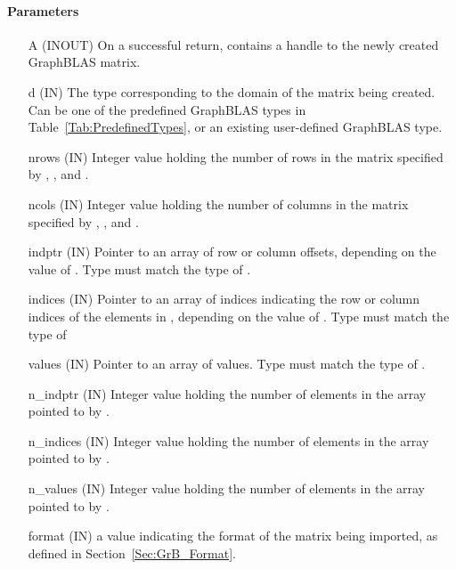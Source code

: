 \paragraph{Parameters}

\begin{itemize}[leftmargin=1.1in]
    \item[{\sf A}]      ({\sf INOUT}) On a successful return, contains a handle to the newly created GraphBLAS matrix.
    \item[{\sf d}] ({\sf IN})    The type corresponding to the domain of the matrix 
                                 being created. Can be one of the predefined
                                 GraphBLAS types in Table~\ref{Tab:PredefinedTypes}, 
                                 or an existing user-defined GraphBLAS type.
    \item[{\sf nrows}] ({\sf IN}) Integer value holding the number of rows in the matrix specified by , , and .
    \item[{\sf ncols}] ({\sf IN}) Integer value holding the number of columns in the matrix specified by , , and .
    \item[{\sf indptr}] ({\sf IN}) Pointer to an array of row or column offsets, depending on the value of .  Type must match the type of .
    \item[{\sf indices}] ({\sf IN}) Pointer to an array of indices indicating the row or column indices of the elements in , depending on the value of .  Type must match the type of 
    \item[{\sf values}] ({\sf IN}) Pointer to an array of values.  Type must match the type of .
    \item[{\sf n\_indptr}] ({\sf IN}) Integer value holding the number of elements in the array pointed to by .
    \item[{\sf n\_indices}] ({\sf IN}) Integer value holding the number of elements in the array pointed to by .
    \item[{\sf n\_values}] ({\sf IN}) Integer value holding the number of elements in the array pointed to by .
    \item[{\sf format}] ({\sf IN}) a value indicating the format of the matrix being imported, as defined in Section~\ref{Sec:GrB_Format}.
\end{itemize}

